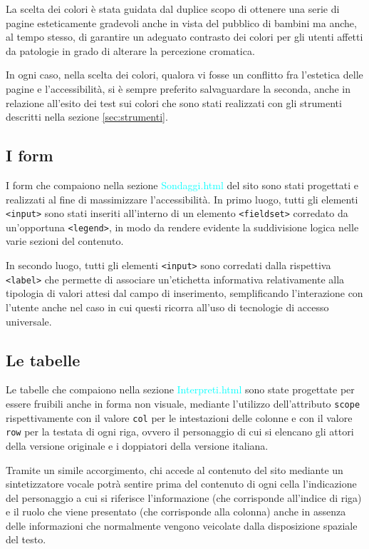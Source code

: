 \documentclass[10pt,a4paper,onecolumn]{article}
\newcommand{\sitepage}[1]{\textcolor{cyan}{\textsf{#1}}}
\begin{document}
La scelta dei colori è stata guidata dal duplice scopo di ottenere una serie di pagine esteticamente gradevoli anche in vista del pubblico di bambini ma anche, al tempo stesso, di garantire un adeguato contrasto dei colori per gli utenti affetti da patologie in grado di alterare la percezione cromatica.

In ogni caso, nella scelta dei colori, qualora vi fosse un conflitto fra l'estetica delle pagine e l'accessibilità, si è sempre preferito salvaguardare la seconda, anche in relazione all'esito dei test sui colori che sono stati realizzati con gli strumenti descritti nella sezione \ref{sec:strumenti}.

\subsection{I form}
I form che compaiono nella sezione \sitepage{Sondaggi.html} del sito sono stati progettati e realizzati al fine di massimizzare l'accessibilità. In primo luogo, tutti gli elementi \texttt{<input>} sono stati inseriti all'interno di un elemento \texttt{<fieldset>} corredato da un'opportuna \texttt{<legend>}, in modo da rendere evidente la suddivisione logica nelle varie sezioni del contenuto.

In secondo luogo, tutti gli elementi \texttt{<input>} sono corredati dalla rispettiva \texttt{<label>} che permette di associare un'etichetta informativa relativamente alla tipologia di valori attesi dal campo di inserimento, semplificando l'interazione con l'utente anche nel caso in cui questi ricorra all'uso di tecnologie di accesso universale.


\subsection{Le tabelle}
Le tabelle che compaiono nella sezione \sitepage{Interpreti.html} sono state progettate per essere fruibili anche in forma non visuale, mediante l'utilizzo dell'attributo \texttt{scope} rispettivamente con il valore \texttt{col} per le intestazioni delle colonne e con il valore \texttt{row} per la testata di ogni riga, ovvero il personaggio di cui si elencano gli attori della versione originale e i doppiatori della versione italiana.

Tramite un simile accorgimento, chi accede al contenuto del sito mediante un sintetizzatore vocale potrà sentire prima del contenuto di ogni cella l'indicazione del personaggio a cui si riferisce l'informazione (che corrisponde all'indice di riga) e il ruolo che viene presentato (che corrisponde alla colonna) anche in assenza delle informazioni che normalmente vengono veicolate dalla disposizione spaziale del testo.
\end{document}
